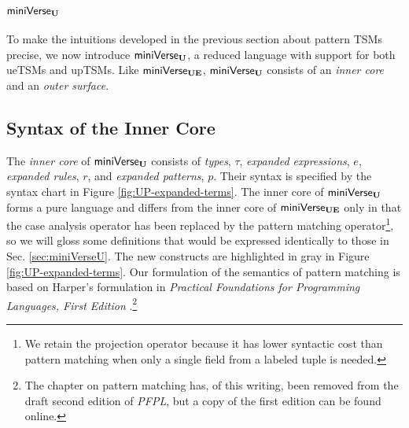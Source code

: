 {{{{\section{\texorpdfstring{$\mathsf{miniVerse}_\textbf{U}$}{miniVerseU}}\label{sec:miniVerseUP}
To make the intuitions developed in the previous section about pattern TSMs precise, we  now introduce $\mathsf{miniVerse}_\textbf{U}$, a reduced language with support for both ueTSMs and upTSMs. Like $\mathsf{miniVerse}_\textbf{UE}$, $\mathsf{miniVerse}_\textbf{U}$ consists of an \emph{inner core} and an \emph{outer surface}.

\subsection{Syntax of the Inner Core}\label{sec:UP-expanded-terms}\label{sec:inner-core-syntax-UP}
The \emph{inner core} of $\mathsf{miniVerse}_\textbf{U}$ consists of \emph{types}, $\tau$, \emph{expanded expressions}, $e$, \emph{expanded rules}, $r$, and \emph{expanded patterns}, $p$. Their syntax is specified by the syntax chart in Figure \ref{fig:UP-expanded-terms}. The inner core of $\mathsf{miniVerse}_\textbf{U}$ forms a pure language and differs from the inner core of $\mathsf{miniVerse}_\textbf{UE}$  only in that the case analysis operator has been replaced by the pattern matching operator\footnote{We retain the projection operator because it has lower syntactic cost than pattern matching when only a single field from a labeled tuple is needed.}, so we will gloss some definitions that would be expressed identically to those in Sec. \ref{sec:miniVerseU}. The new constructs are highlighted in gray in Figure \ref{fig:UP-expanded-terms}. Our formulation of the semantics of pattern matching is based on Harper's formulation in \emph{Practical Foundations for Programming Languages, First Edition} \cite{pfple1}.\footnote{The chapter on pattern matching has, of this writing, been removed from the draft second edition of \emph{PFPL}, but a copy of the first edition can be found online.}

}}}}
